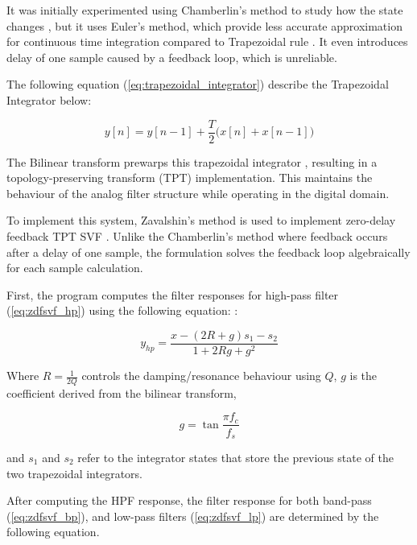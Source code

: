 It was initially experimented using Chamberlin's method to study how the state changes \cite{algorithm_chamberlin_svf},
but it uses Euler's method, which provide less accurate approximation for continuous time integration compared to 
Trapezoidal rule \cite{spiteri_chap3}. It even introduces delay of one sample caused by a feedback loop, which is
unreliable.

The following equation (\ref{eq:trapezoidal_integrator}) describe the Trapezoidal Integrator below:

\begin{equation}\label{eq:trapezoidal_integrator}
y\left[n\right] = y \left[n-1\right]+\frac{T}{2}\bigl(x\left[n\right]+x\left[n-1\right]\bigr)
\end{equation}

The Bilinear transform prewarps this trapezoidal integrator \cite{vafilterdesign2021}, resulting in a 
topology-preserving transform (TPT) implementation. This maintains the behaviour of the analog filter structure
while operating in the digital domain.

To implement this system, Zavalshin's method is used to implement zero-delay feedback TPT SVF \cite{vafilterdesign2021,synthengineer_zdf_filters}. 
Unlike the Chamberlin's method where feedback occurs after a delay of one sample, the formulation solves the feedback loop algebraically for
each sample calculation.

First, the program computes the filter responses for high-pass filter (\ref{eq:zdfsvf_hp}) using the following equation: 
 \cite{vafilterdesign2021}:

\begin{equation}\label{eq:zdfsvf_hp}
    y_{hp} = \frac{x - (2R + g)s_1 - s_2}{1 + 2Rg + g^2}
\end{equation}

Where $R = \frac{1}{2Q}$ controls the damping/resonance behaviour using $Q$, $g$ is the coefficient derived from the bilinear transform,

\begin{equation}\label{eq:zdfsvf_g}
    g = \tan{\frac{\pi f_c}{f_s}}
\end{equation}

and $s_1$ and $s_2$ refer to the integrator states that store the previous state of 
the two trapezoidal integrators.

After computing the HPF response, the filter response for both band-pass
(\ref{eq:zdfsvf_bp}), and low-pass filters (\ref{eq:zdfsvf_lp}) are determined by the following equation.


